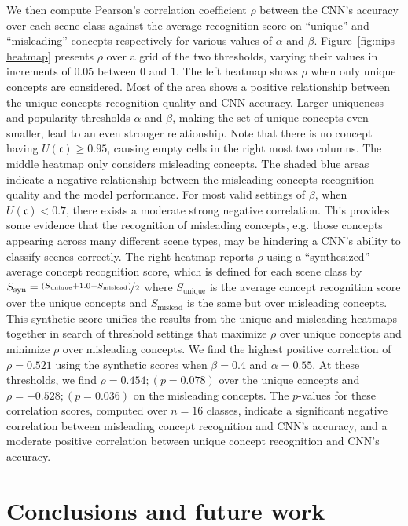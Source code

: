 \documentclass{article}
\begin{document}
We then compute Pearson's correlation coefficient $\rho$ between the CNN's accuracy over each scene class against the 
average recognition score on ``unique'' and ``misleading'' concepts respectively for various values of $\alpha$ and $\beta$. 
Figure~\ref{fig:nips-heatmap} presents $\rho$ over a grid of the two thresholds, varying their values in
increments of $0.05$ between $0$ and $1$. 
The left heatmap shows $\rho$ when only unique concepts are considered.
Most of the area shows a positive relationship between the unique concepts recognition quality and CNN accuracy. Larger uniqueness and popularity thresholds $\alpha$ and $\beta$, making the set of unique concepts even
smaller, lead to an even stronger relationship. 
Note that there is no concept having $U(\mathfrak{c})\geq 0.95$, causing empty cells in the right most two 
columns.
The middle heatmap only considers misleading concepts. The shaded blue areas indicate a negative relationship between the misleading concepts recognition quality and the model performance.
For most valid settings of $\beta$, when $U(\mathfrak{c}) < 0.7$, there exists a moderate strong negative correlation. This provides some evidence
that the recognition of misleading concepts, e.g. those 
concepts appearing across many different scene types, may be hindering a CNN's ability to classify scenes correctly. 
The right heatmap reports $\rho$ using a ``synthesized'' 
average concept recognition score, which is defined for each scene class by 
$S_\text{syn} = \nicefrac{(S_\text{unique} + 1.0 - S_\text{mislead})}{2}$ where $S_\text{unique}$
is the average concept recognition score over the unique concepts and $S_\text{mislead}$
is the same but over misleading concepts. This synthetic score 
unifies the results from the unique and misleading heatmaps together in search of 
threshold settings that maximize $\rho$ over unique concepts and minimize $\rho$ over 
misleading concepts. We find the highest positive correlation of $\rho = 0.521$ using the synthetic scores
when $\beta=0.4$ and $\alpha=0.55$. 
At these thresholds, we find $\rho = 0.454; (p = 0.078)$ over the unique concepts and $\rho = -0.528; (p = 0.036)$
on the misleading concepts. The $p$-values for these correlation scores, computed over $n=16$
classes, indicate a significant negative correlation between misleading concept recognition and
CNN's accuracy, and a moderate positive correlation between unique concept recognition and CNN's accuracy. 

\section{Conclusions and future work}
\label{sec:conclusions}
\end{document}
